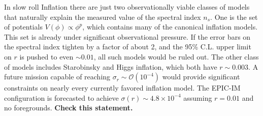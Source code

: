 In slow roll Inflation 
there are just two observationally viable classes of models that naturally explain the measured value of the spectral index $n_s$.
One is the set of potentials $V(\phi)\propto\phi^p$, which contains many of the canonical inflation models. This 
set is already under significant observational pressure. If the error bars on the spectral index tighten by a factor of about 2, 
and the 95\% C.L. upper limit on $r$ is pushed to even $\sim0.01$, all such models would be ruled out. 
The other class of models includes Starobinsky and Higgs inflation, which both have $r\sim0.003$. A future mission 
capable of reaching $\sigma_r\sim\mathcal{O}(10^{-4})$ would provide significant constraints on nearly every currently favored 
inflation model. The EPIC-IM configuration is forecasted to achieve $\sigma(r)\sim4.8 \times 10^{-4}$ assuming $r=0.01$ 
and no foregrounds. {\bf Check this statement.}
